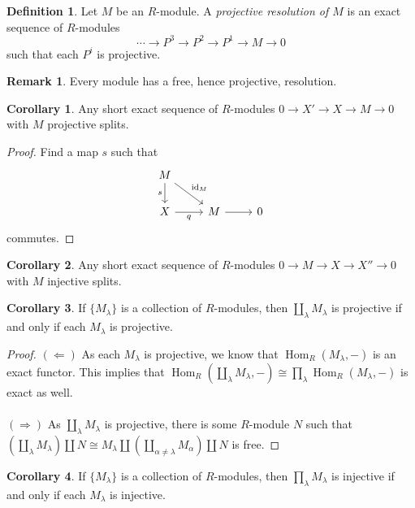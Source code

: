 \documentclass[10pt,letterpaper,cm]{nupset}
\theoremstyle{definition}
\newtheorem*{definition}{Definition}
\newtheorem{remark}{Remark}
\newtheorem{corollary}{Corollary}
\newcommand{\1}{\mathbf{1}}
\newcommand{\0}{\vec 0}
\DeclareMathOperator{\id}{id}
\DeclareMathOperator{\Hom}{Hom}
\begin{document}
\begin{definition}
Let $M$ be an $R$-module. A \textit{projective resolution of $M$} is an exact sequence of $R$-modules $$\cdots \to P^3 \to P^2 \to P^1 \to M \to 0$$ such that each $P^i$ is projective.  
\end{definition}

\begin{remark}
Every module has a free, hence projective, resolution. 
\end{remark}

\begin{corollary}
Any short exact sequence of $R$-modules $0 \to X' \to X \to M \to 0$ with $M$ projective splits. 
\end{corollary}
\begin{proof}
Find a map $s$ such that
\[\begin{tikzcd}
M \arrow[rd, "\id_M"] \arrow[d, "s"'] &  &  \\
X \arrow[r, "q"'] & M \arrow[r] & 0
\end{tikzcd}
\] commutes. 
\end{proof}

\begin{corollary}
Any short exact sequence of $R$-modules $0 \to M \to X \to X'' \to 0$ with $M$ injective splits. 
\end{corollary}

\begin{corollary}
If $\{M_{\lambda}\}$ is a collection of $R$-modules, then $\coprod_{\lambda} M_{\lambda}$ is projective  if and only if each $M_{\lambda}$ is projective. 
\end{corollary}
\begin{proof}
$(\Longleftarrow)$ As each $M_{\lambda}$ is projective, we know that $\Hom_R(M_{\lambda}, -)$ is an exact functor. This implies that $\Hom_R(\coprod_{\lambda} M_{\lambda}, -) \cong \prod_{\lambda} \Hom_R(M_{\lambda}, -)$ is exact as well.
\\ \\ 
$(\Longrightarrow)$ As $\coprod_{\lambda} M_{\lambda}$ is projective, there is some $R$-module $N$ such that $(\coprod_{\lambda} M_{\lambda}) \coprod N \cong M_{\lambda} \coprod  (\coprod_{\alpha \ne \lambda} M_{\alpha})\coprod N$ is free.
\end{proof}

\begin{corollary}
If $\{M_{\lambda}\}$ is a collection of $R$-modules, then $\prod_{\lambda} M_{\lambda}$ is injective  if and only if each $M_{\lambda}$ is injective. 
\end{corollary}
\end{document}

